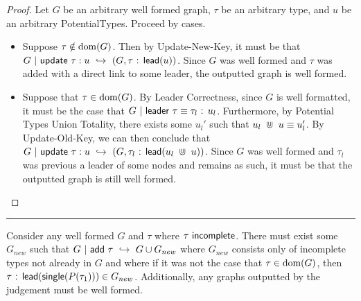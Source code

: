 \begin{proof}
    Let $G$ be an arbitrary well formed graph, $\tau$ be an arbitrary type, and $u$ be an arbitrary PotentialTypes. Proceed by cases.
    \begin{itemize}
        \item Suppose $\tau \notin \operatorname{dom}(G)$. Then by Update-New-Key, it must be that $G~|~\normalfont\textsf{update}~\tau:u ~\hookrightarrow~ (G, \tau\normalfont\textsf{ : }\normalfont\textsf{lead}(u))$. Since $G$ was well formed and $\tau$ was added with a direct link to some leader, the outputted graph is well formed.
        \item Suppose that $\tau \in \operatorname{dom}(G)$. By Leader Correctness, since $G$ is well formatted, it must be the case that $G~|~\normalfont\textsf{leader}~\tau \equiv \tau_l\normalfont\textsf{ : }u_l$. Furthermore, by Potential Types Union Totality, there exists some $u_l'$ such that $u_l~\Cup~u \equiv u_l'$. By Update-Old-Key, we can then conclude that $G~|~\normalfont\textsf{update}~\tau:u ~\hookrightarrow~ (G, \tau_l\normalfont\textsf{ : }\normalfont\textsf{lead}(u_l~\Cup~u))$. Since $G$ was well formed and $\tau_l$ was previous a leader of some nodes and remains as such, it must be that the outputted graph is still well formed.
    \end{itemize}
\end{proof}

\noindent\rule{\textwidth}{1pt}

\begin{lemma}[name=Addition Correctness]
Consider any well formed $G$ and $\tau$ where $\tau ~ \normalfont\textsf{incomplete}$.
There must exist some $G_{new}$ such that $G~|~\normalfont\textsf{add}~\tau ~\hookrightarrow~ G \cup G_{new}$ where  $G_{new}$ consists only of incomplete types not already in $G$ and where if it was not the case that $\tau \in \operatorname{dom}(G)$, then $\tau\normalfont\textsf{ : }\normalfont\textsf{lead}(\normalfont\textsf{single}(P(\tau_1))) \in G_{new}$. Additionally, any graphs outputted by the judgement must be well formed.
\end{lemma}

